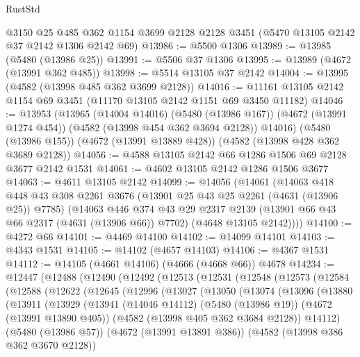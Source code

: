 \begin{lexlean}{RustStd}
\begin{coremodule}
    @3150
    @25
    @485
    @362
    @1154
    @3699
    @2128
    @2128
    @3451
    (@5470 @13105 @2142 @37 @2142 @1306 @2142 @69)
@13986 := @5500 @1306
@13989 := @13985 (@5480 (@13986 @25))
@13991 := @5506 @37 @1306
@13995 := @13989 (@4672 (@13991 @362 @485))
@13998 := @5514 @13105 @37 @2142
@14004 := @13995 (@4582 (@13998 @485 @362 @3699 @2128))
@14016 := @11161 @13105 @2142 @1154 @69 @3451 (@11170 @13105 @2142 @1151 @69 @3450 @11182)
@14046 := @13953
    (@13965
      (@14004 @14016)
      (@5480 (@13986 @167))
      (@4672 (@13991 @1274 @454))
      (@4582 (@13998 @454 @362 @3694 @2128))
      @14016)
    (@5480 (@13986 @155))
    (@4672 (@13991 @13889 @428))
    (@4582 (@13998 @428 @362 @3689 @2128))
@14056 := @4588 @13105 @2142 @66 @1286 @1506 @69 @2128 @3677 @2142 @1531
@14061 := @4602 @13105 @2142 @1286 @1506 @3677
@14063 := @4611 @13105 @2142
@14099 := @14056
    (@14061
      (@14063
        @418
        @448
        @43
        @308
        @2261
        @3676
        (@13901 @25 @43 @25 @2261 (@4631 (@13906 @25)) @7785)
        (@14063
          @446
          @374
          @43
          @29
          @2317
          @2139
          (@13901 @66 @43 @66 @2317 (@4631 (@13906 @66)) @7702)
          (@4648 @13105 @2142))))
@14100 := @4272 @66
@14101 := @4469 @14100
@14102 := @14099 @14101
@14103 := @4343 @1531
@14105 := @14102 (@4657 @14103)
@14106 := @4367 @1531
@14112 := @14105 (@4661 @14106) (@4666 (@4668 @66)) @4678
@14234 := @12447
    (@12488
      (@12490
        (@12492
          (@12513
            (@12531
              (@12548
                (@12573
                  (@12584
                    (@12588
                      (@12622
                        (@12645
                          (@12996
                            (@13027
                              (@13050
                                (@13074
                                  (@13096
                                    (@13880
                                      (@13911
                                        (@13929
                                          (@13941
                                            (@14046 @14112)
                                            (@5480 (@13986 @19))
                                            (@4672 (@13991 @13890 @405))
                                            (@4582 (@13998 @405 @362 @3684 @2128))
                                            @14112)
                                          (@5480 (@13986 @57))
                                          (@4672 (@13991 @13891 @386))
                                          (@4582 (@13998 @386 @362 @3670 @2128))

\end{coremodule}
\end{lexlean}
